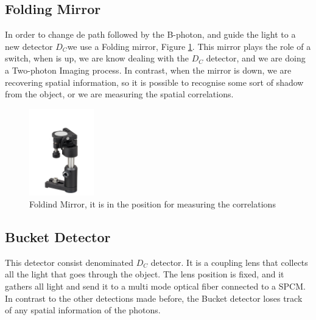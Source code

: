 \subsection{Folding Mirror}
In order to change de path followed by the B-photon, and guide the light to a new detector $D_C$we use a Folding mirror, Figure \ref{fig:foldingMirror}.
This mirror plays the role of a switch, when is up, we are know dealing with the
$D_C$ detector, and we are doing a Two-photon Imaging process. In contrast, when the mirror is 
down, we are recovering spatial information, so it is possible to recognise some sort of
shadow from the object, or we are measuring the spatial correlations.
\begin{figure}[h!]
\centering
 \includegraphics[width=0.25\textwidth]{Figures/foldingMirror.jpg}
 \caption{Foldind Mirror, it is in the position for measuring the correlations}
\label{fig:foldingMirror} 
\end{figure}

\subsection{Bucket Detector}
This detector consist denominated $D_C$ detector. It is a coupling lens that collects all the light that goes through the object.
The lens position is fixed, and it gathers all light and send it to a multi mode optical fiber connected to a SPCM.
In contrast to the other detections made before, the Bucket detector loses track of any spatial information of the photons. 
